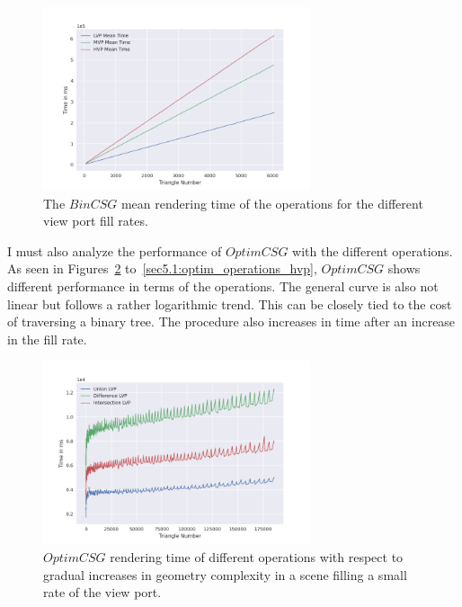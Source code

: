 \documentclass[a4paper,11pt,oneside]{article}
\begin{document}
\begin{figure}[H]
	\centering
	\includegraphics[width=0.7\textwidth]{section5/plots/bin_csg_mean.png}
	\caption{The $BinCSG$ mean rendering time of the operations for the different view port fill rates.}
	\label{sec5.1:bin_operations}
\end{figure}

I must also analyze the performance of $OptimCSG$ with the different operations. As seen in Figures~\ref{sec5.1:optim_operations_lvp} to~\ref{sec5.1:optim_operations_hvp}, $OptimCSG$ shows different performance in terms of the operations. The general curve is also not linear but follows a rather logarithmic trend. This can be closely tied to the cost of traversing a binary tree. The procedure also increases in time after an increase in the fill rate.

\begin{figure}[H]
	\centering
	\includegraphics[width=0.7\textwidth]{section5/plots/optim_csg_lvp.png}
	\caption{$OptimCSG$ rendering time of different operations with respect to gradual increases in geometry complexity in a scene filling a small rate of the view port.}
	\label{sec5.1:optim_operations_lvp}
\end{figure}
\end{document}
